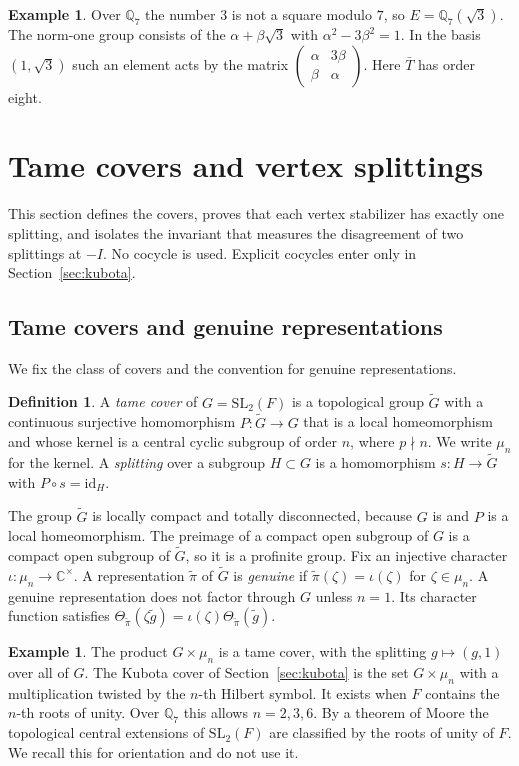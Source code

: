 \documentclass[12pt,letterpaper]{article}
\numberwithin{equation}{section}
\theoremstyle{definition}
\newtheorem{definition}[theorem]{Definition}
\newtheorem{example}[theorem]{Example}
\theoremstyle{remark}
\newcommand{\Gt}{\widetilde G}
\newcommand{\sm}[4]{\left(\begin{smallmatrix}#1&#2\\#3&#4\end{smallmatrix}\right)}
\begin{document}
\begin{example}\label{ex:torus}
Over $\mathbb Q_7$ the number $3$ is not a square modulo $7$, so $E=\mathbb Q_7(\sqrt3)$. The norm-one group consists of the $\alpha+\beta\sqrt3$ with $\alpha^2-3\beta^2=1$. In the basis $(1,\sqrt3)$ such an element acts by the matrix $\sm{\alpha}{3\beta}{\beta}{\alpha}$. Here $\bar T$ has order eight.
\end{example}

\section{Tame covers and vertex splittings}\label{sec:cover}
This section defines the covers, proves that each vertex stabilizer has exactly one splitting, and isolates the invariant that measures the disagreement of two splittings at $-I$. No cocycle is used. Explicit cocycles enter only in Section~\ref{sec:kubota}.

\subsection*{Tame covers and genuine representations}
We fix the class of covers and the convention for genuine representations.

\begin{definition}\label{def:tame}
A \emph{tame cover} of $G=\mathrm{SL}_2(F)$ is a topological group $\Gt$ with a continuous surjective homomorphism $P:\Gt\to G$ that is a local homeomorphism and whose kernel is a central cyclic subgroup of order $n$, where $p\nmid n$. We write $\mu_n$ for the kernel. A \emph{splitting} over a subgroup $H\subset G$ is a homomorphism $s:H\to\Gt$ with $P\circ s=\mathrm{id}_H$.
\end{definition}

The group $\Gt$ is locally compact and totally disconnected, because $G$ is and $P$ is a local homeomorphism. The preimage of a compact open subgroup of $G$ is a compact open subgroup of $\Gt$, so it is a profinite group. Fix an injective character $\iota:\mu_n\to\mathbb C^\times$. A representation $\widetilde\pi$ of $\Gt$ is \emph{genuine} if $\widetilde\pi(\zeta)=\iota(\zeta)$ for $\zeta\in\mu_n$. A genuine representation does not factor through $G$ unless $n=1$. Its character function satisfies $\Theta_{\widetilde\pi}(\zeta\widetilde g)=\iota(\zeta)\Theta_{\widetilde\pi}(\widetilde g)$.

\begin{example}\label{ex:covers}
The product $G\times\mu_n$ is a tame cover, with the splitting $g\mapsto(g,1)$ over all of $G$. The Kubota cover of Section~\ref{sec:kubota} is the set $G\times\mu_n$ with a multiplication twisted by the $n$-th Hilbert symbol. It exists when $F$ contains the $n$-th roots of unity. Over $\mathbb Q_7$ this allows $n=2,3,6$. By a theorem of Moore \cite{Mo68} the topological central extensions of $\mathrm{SL}_2(F)$ are classified by the roots of unity of $F$. We recall this for orientation and do not use it.
\end{example}
\end{document}

